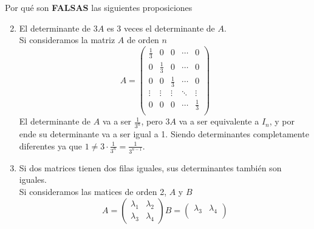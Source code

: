 \item Por qué son \textbf{FALSAS} las siguientes proposiciones
    \begin{enumerate}[label=\listAlph]
        \setcounter{enumii}{1}
        \item El determinante de \(3A\) es 3 veces el determinante de \(A\). \\
            Si consideramos la matriz \(A\) de orden \(n\)
            \[
                A = \begin{pmatrix}
                    \frac{1}{3} & 0 & 0 & \cdots & 0 \\
                    0 & \frac{1}{3} & 0  & \cdots & 0 \\
                    0 & 0 & \frac{1}{3} & \cdots & 0 \\
                    \vdots & \vdots & \vdots & \ddots & \vdots \\
                    0 & 0 & 0 & \cdots & \frac{1}{3} \\
                \end{pmatrix}
            \]
            El determinante de \(A\) va a ser \(\frac{1}{3^n}\), pero \(3A\) va a ser equivalente a \(I_n\), y por ende 
            su determinante va a ser igual a 1. Siendo determinantes completamente diferentes ya que \(1 \neq 3 \cdot \frac{1}{3^n} = \frac{1}{3^{n-1}}\).
        \setcounter{enumii}{5}
        \item Si dos matrices tienen dos filas iguales, sus determinantes también son iguales. \\
            Si consideramos las matices de orden 2, \(A\) y \(B\)
            \[
                A = \begin{pmatrix}
                    \lambda_1 & \lambda_2 \\
                    \lambda_3 & \lambda_4
                \end{pmatrix}
                B = \begin{pmatrix}
                    \lambda_3 & \lambda_4 \\

\end{pmatrix}\]
\end{enumerate}
